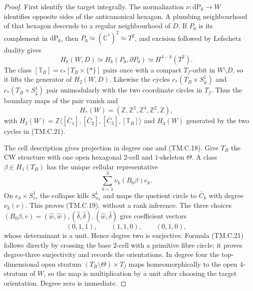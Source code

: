 \begin{proof}
First identify the target integrally.  The normalization
$\nu:\mathrm{dP}_6\to W$ identifies opposite sides of the anticanonical
hexagon.  A plumbing neighbourhood of that hexagon descends to a regular
neighbourhood of $D$.  If $P_0$ is its complement in $\mathrm{dP}_6$, then
$P_0\simeq(\mathbb C^*)^2\simeq T^2$, and excision followed by Lefschetz
duality gives
\[
 H_k(W,D)\simeq H_k(P_0,\partial P_0)
 \simeq H^{4-k}(T^2).
\tag{TM.C.22}
\]
The class $[\mathbb T_B]=c_*[T_B\times\{*\}]$ pairs once with a compact
$T_f$-orbit in $W\setminus D$, so it lifts the generator of $H_2(W,D)$.
Likewise the cycles $c_*(T_B\times S^1_{\widehat w})$ and
$c_*(T_B\times S^1_{\widehat\delta})$ pair unimodularly with the two
coordinate circles in $T_f$.  Thus the boundary maps of the pair vanish and
\[
 H_*(W)=(\mathbb Z,\mathbb Z^2,\mathbb Z^4,\mathbb Z^2,\mathbb Z),
\tag{TM.C.23}
\]
with
$H_2(W)=\mathbb Z\langle[\bar C_1],[\bar C_2],[\bar C_3],
[\mathbb T_B]\rangle$ and $H_3(W)$ generated by the two cycles in (TM.C.21).

The cell description gives projection in degree one and (TM.C.18).  Give $T_B$
the CW structure with one open hexagonal $2$-cell and $1$-skeleton $\Theta$.
A class $\beta\in H_1(T_B)$ has the unique cellular representative
\[
 \sum_{k=1}^3\nu_k(B_0\beta)e_k.
\]
On $e_k\times S^1_v$, the collapse kills $S^1_{n_k}$ and maps the quotient
circle to $\bar C_k$ with degree $\nu_k(v)$.  This proves (TM.C.19), without a
rank inference.  The three choices
$(B_0\beta,v)=(\widehat w,\widehat w),
(\widehat\delta,\widehat\delta),(\widehat w,\widehat\delta)$ give coefficient
vectors
\[
 (0,1,1),\qquad(1,1,0),\qquad(0,1,0),
\]
whose determinant is a unit.  Hence degree two is surjective.  Formula
(TM.C.21) follows directly by crossing the base $2$-cell with a primitive fibre
circle; it proves degree-three surjectivity and records the orientations.
 In degree four the top-dimensional open stratum
$(T_B\setminus\Theta)\times T_f$ maps homeomorphically to the open
$4$-stratum of $W$, so the map is multiplication by a unit after choosing the
target orientation.  Degree zero is immediate.


\end{proof}
